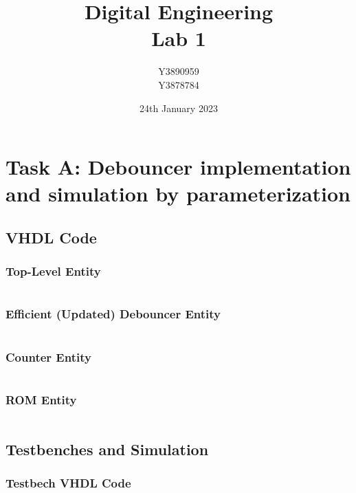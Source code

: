 \documentclass[11pt]{report}
\title{Digital Engineering\\Lab 1}
\author{Y3890959\\Y3878784}
\date{24th January 2023}
\begin{document}
\maketitle

\chapter*{Task A: Debouncer implementation and simulation by parameterization}

\section*{VHDL Code}

\subsection*{Top-Level Entity}
\inputminted{vhdl}{../../Lab1/Lab1.srcs/sources_1/imports/new/fibonacci_8bit_sequence.vhd}

\subsection*{Efficient (Updated) Debouncer Entity}
\inputminted{vhdl}{../../Lab1/Lab1.srcs/sources_1/new/efficient_debouncer.vhd}

\subsection*{Counter Entity}
\inputminted{vhdl}{../../Lab1/Lab1.srcs/sources_1/new/parameterizable_counter.vhd}

\subsection*{ROM Entity}
\inputminted{vhdl}{../../Lab1/Lab1.srcs/sources_1/imports/new/fibonacci_8bit_async_read_rom.vhd}



\section*{Testbenches and Simulation}

\subsection*{Testbech VHDL Code}
\inputminted{vhdl}{../../Lab1/Lab1.srcs/sim_1/imports/new/fibonacci_8bit_sequence_tb.vhd}
\end{document}
